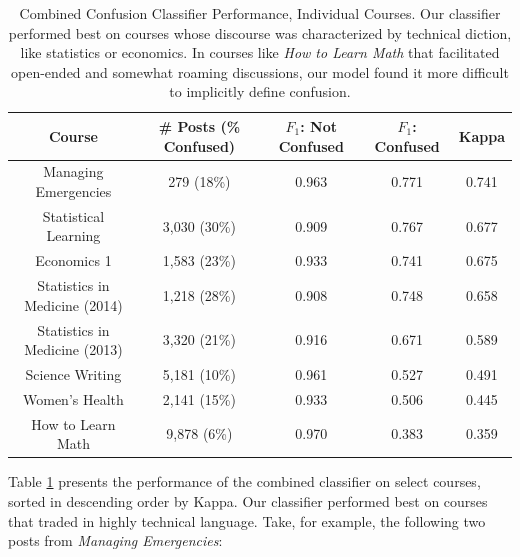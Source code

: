 \documentclass{edm_template}
\begin{document}
\begin{table}
       \centering
       \begin{tabular}{|c|c|c|c|c|}
       \hline
       Course                         & \# Posts (\% Confused) & $F_{1}$: Not Confused & $F_{1}$: Confused & Kappa \\ \hline
       Managing Emergencies              & 279 (18\%)                         & 0.963                 & 0.771             & 0.741 \\ \hline
       Statistical Learning              & 3,030 (30\%)                        & 0.909                 & 0.767             & 0.677 \\ \hline
       Economics 1                       & 1,583 (23\%)                     & 0.933                 & 0.741             & 0.675 \\ \hline
       Statistics in Medicine (2014)     & 1,218 (28\%)                        & 0.908                 & 0.748             & 0.658 \\ \hline
       Statistics in Medicine (2013)     & 3,320 (21\%)                         & 0.916                 & 0.671             & 0.589 \\ \hline
       Science Writing                   & 5,181 (10\%)                         & 0.961                 & 0.527             & 0.491 \\ \hline
       Women's Health                    & 2,141 (15\%)                         & 0.933                 & 0.506             & 0.445 \\ \hline
       How to Learn Math                 & 9,878 (6\%)                        & 0.970                 & 0.383             & 0.359 \\ \hline
       \end{tabular}
       \caption{\textnormal{
       Combined Confusion Classifier Performance, Individual Courses. Our classifier performed best on courses whose discourse was characterized by technical diction, like statistics or economics. In courses like \emph{How to Learn Math} that facilitated open-ended and somewhat roaming discussions, our model found it more difficult to implicitly define confusion. 
       }} %
       \label{table:confusion_courses} %
\end{table}

Table \ref{table:confusion_courses} presents the performance of the combined classifier on select courses, sorted in descending order by Kappa. Our classifier performed best on courses that traded in highly technical language. Take, for example, the following two posts from \emph{Managing Emergencies}:
\end{document}
